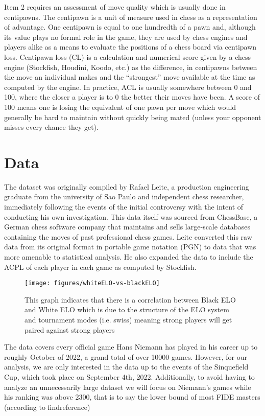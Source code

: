 \documentclass[12pt, letterpaper, titlepage]{article}
\begin{document}
Item 2 requires an assessment of move quality which is usually done in centipawns. The centipawn is a unit of measure used in chess as a representation of advantage. One centipawn is equal to one hundredth of a pawn and, although its value plays no formal role in the game, they are used by chess engines and players alike as a means to evaluate the positions of a chess board via centipawn loss. Centipawn loss (CL) is a calculation and numerical score given by a chess engine  (Stockfish, Houdini, Koodo, etc.) as the difference, in centipawns between the move an individual makes and the “strongest” move available at the time as computed by the engine.
In practice, ACL is usually somewhere between 0 and 100, where the closer a player is to 0 the better their moves have been. A score of 100 means one is losing the equivalent of one pawn per move which would generally be hard to maintain without quickly being mated (unless your opponent misses every chance they get).

\section*{Data}
\label{sec:data}

The dataset was originally compiled by Rafael Leite, a production engineering graduate from the university of Sao Paulo and independent chess researcher, immediately following the events of the initial controversy with the intent of conducting his own investigation. This data itself was sourced from ChessBase, a German chess software company that maintains and sells large-scale databases containing the moves of past professional chess games. Leite converted this raw data from its original format in portable game notation (PGN) to data that was more amenable to statistical analysis. He also expanded the data to include the ACPL of each player in each game as computed by Stockfish.

\begin{figure}
    \centering
    \texttt{[image: figures/whiteELO-vs-blackELO]}
    \caption{This graph indicates that there is a correlation between Black ELO and White ELO which is due to the structure of the ELO system and tournament modes (i.e. swiss) meaning strong players will get paired against strong players}
    \label{fig:elo_lineplot}
\end{figure}

The data covers every official game Hans Niemann has played in his career up to roughly October of 2022, a grand total of over 10000 games. However, for our analysis, we are only interested in the data up to the events of the Sinquefield Cup, which took place on September 4th, 2022. Additionally, to avoid having to analyze an unnecessarily large dataset we will focus on Niemann's games while his ranking was above 2300, that is to say the lower bound of most FIDE masters (according to findreference)
\end{document}
